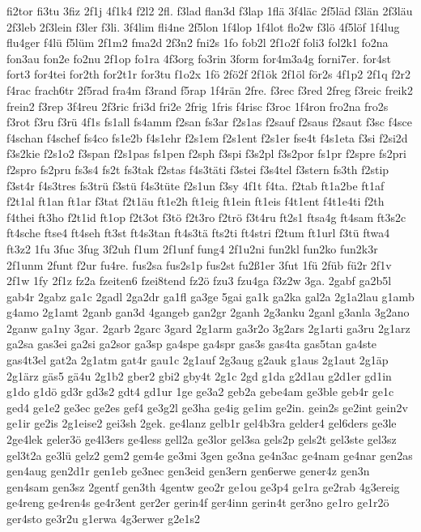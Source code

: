 {fi2tor
fi3tu
3fiz
2f1j
4f1k4
f2l2
2fl.
f3lad
flan3d
f3lap
1flä
3f4läc
2f5läd
f3län
2f3läu
2f3leb
2f3lein
f3ler
f3li.
3f4lim
fli4ne
2f5lon
1f4lop
1f4lot
flo2w
f3lö
4f5löf
1f4lug
flu4ger
f4lü
f5lüm
2f1m2
fma2d
2f3n2
fni2s
1fo
fob2l
2f1o2f
foli3
fol2k1
fo2na
fon3au
fon2e
fo2nu
2f1op
fo1ra
4f3org
fo3rin
3form
for4m3a4g
forni7er.
for4st
fort3
for4tei
for2th
for2t1r
for3tu
f1o2x
1fö
2fö2f
2f1ök
2f1öl
för2s
4f1p2
2f1q
f2r2
f4rac
frach6tr
2f5rad
fra4m
f3rand
f5rap
1f4rän
2fre.
f3rec
f3red
2freg
f3reic
freik2
frein2
f3rep
3f4reu
2f3ric
fri3d
fri2e
2frig
1fris
f4risc
f3roc
1f4ron
fro2na
fro2s
f3rot
f3ru
f3rü
4f1s
fs1all
fs4amm
f2san
fs3ar
f2s1as
f2sauf
f2saus
f2saut
f3sc
f4sce
f4schan
f4schef
fs4co
fs1e2b
f4s1ehr
f2s1em
f2s1ent
f2s1er
fse4t
f4s1eta
f3si
f2si2d
f3s2kie
f2s1o2
f3span
f2s1pas
fs1pen
f2sph
f3spi
f3s2pl
f3s2por
fs1pr
f2spre
fs2pri
f2spro
fs2pru
fs3s4
fs2t
fs3tak
f2stas
f4s3täti
f3stei
f3s4tel
f3stern
fs3th
f2stip
f3st4r
f4s3tres
fs3trü
f3stü
f4s3tüte
f2s1un
f3sy
4f1t
f4ta.
f2tab
ft1a2be
ft1af
f2t1al
ft1an
ft1ar
f3tat
f2t1äu
ft1e2h
ft1eig
ft1ein
ft1eis
f4t1ent
f4t1e4ti
f2th
f4thei
ft3ho
f2t1id
ft1op
f2t3ot
f3tö
f2t3ro
f2trö
f3t4ru
ft2s1
ftsa4g
ft4sam
ft3s2c
ft4sche
ftse4
ft4seh
ft3st
ft4s3tan
ft4s3tä
fts2ti
ft4stri
f2tum
ft1url
f3tü
ftwa4
ft3z2
1fu
3fuc
3fug
3f2uh
f1um
2f1unf
fung4
2f1u2ni
fun2kl
fun2ko
fun2k3r
2f1unm
2funt
f2ur
fu4re.
fus2sa
fus2s1p
fus2st
fu2ß1er
3fut
1fü
2füb
fü2r
2f1v
2f1w
1fy
2f1z
fz2a
fzeiten6
fzei8tend
fz2ö
fzu3
fzu4ga
f3z2w
3ga.
2gabf
ga2b5l
gab4r
2gabz
ga1c
2gadl
2ga2dr
ga1fl
ga3ge
5gai
ga1k
ga2ka
gal2a
2g1a2lau
g1amb
g4amo
2g1amt
2ganb
gan3d
4gangeb
gan2gr
2ganh
2g3anku
2ganl
g3anla
3g2ano
2ganw
ga1ny
3gar.
2garb
2garc
3gard
2g1arm
ga3r2o
3g2ars
2g1arti
ga3ru
2g1arz
ga2sa
gas3ei
ga2si
ga2sor
ga3sp
ga4spe
ga4spr
gas3s
gas4ta
gas5tan
ga4ste
gas4t3el
gat2a
2g1atm
gat4r
gau1c
2g1auf
2g3aug
g2auk
g1aus
2g1aut
2g1äp
2g1ärz
gäs5
gä4u
2g1b2
gber2
gbi2
gby4t
2g1c
2gd
g1da
g2d1au
g2d1er
gd1in
g1do
g1dö
gd3r
gd3s2
gdt4
gd1ur
1ge
ge3a2
geb2a
gebe4am
ge3ble
geb4r
ge1c
ged4
ge1e2
ge3ec
ge2es
gef4
ge3g2l
ge3ha
ge4ig
ge1im
ge2in.
gein2s
ge2int
gein2v
ge1ir
ge2is
2g1eise2
gei3sh
2gek.
ge4lanz
gelb1r
gel4b3ra
gelder4
gel6ders
ge3le
2ge4lek
geler3ö
ge4l3ers
ge4less
gell2a
ge3lor
gel3sa
gels2p
gels2t
gel3ste
gel3sz
gel3t2a
ge3lü
gelz2
gem2
gem4e
ge3mi
3gen
ge3na
ge4n3ac
ge4nam
ge4nar
gen2as
gen4aug
gen2d1r
gen1eb
ge3nec
gen3eid
gen3ern
gen6erwe
gener4z
gen3n
gen4sam
gen3sz
2gentf
gen3th
4gentw
geo2r
ge1ou
ge3p4
ge1ra
ge2rab
4g3ereig
ge4reng
ge4ren4s
ge4r3ent
ger2er
gerin4f
ger4inn
gerin4t
ger3no
ge1ro
ge1r2ö
ger4sto
ge3r2u
g1erwa
4g3erwer
g2e1s2
}
